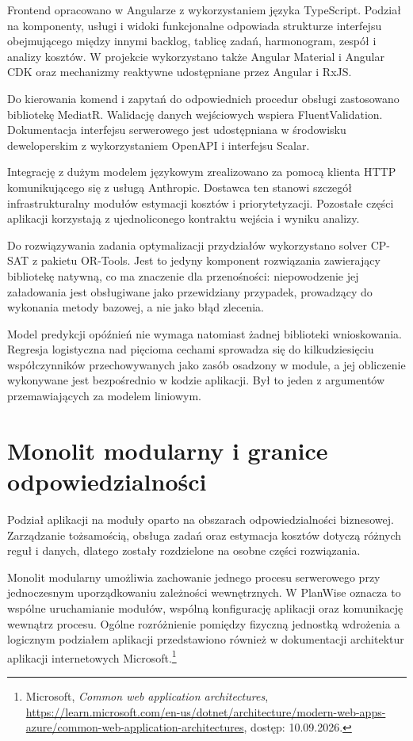 Frontend opracowano w Angularze z wykorzystaniem języka TypeScript. Podział na komponenty, usługi i widoki funkcjonalne odpowiada strukturze interfejsu obejmującego między innymi backlog, tablicę zadań, harmonogram, zespół i analizy kosztów. W projekcie wykorzystano także Angular Material i Angular CDK oraz mechanizmy reaktywne udostępniane przez Angular i RxJS.

Do kierowania komend i zapytań do odpowiednich procedur obsługi zastosowano bibliotekę MediatR. Walidację danych wejściowych wspiera FluentValidation. Dokumentacja interfejsu serwerowego jest udostępniana w środowisku deweloperskim z wykorzystaniem OpenAPI i interfejsu Scalar.

Integrację z dużym modelem językowym zrealizowano za pomocą klienta HTTP komunikującego się z usługą Anthropic. Dostawca ten stanowi szczegół infrastrukturalny modułów estymacji kosztów i priorytetyzacji. Pozostałe części aplikacji korzystają z ujednoliconego kontraktu wejścia i wyniku analizy.

Do rozwiązywania zadania optymalizacji przydziałów wykorzystano solver CP-SAT z pakietu OR-Tools. Jest to jedyny komponent rozwiązania zawierający bibliotekę natywną, co ma znaczenie dla przenośności: niepowodzenie jej załadowania jest obsługiwane jako przewidziany przypadek, prowadzący do wykonania metody bazowej, a nie jako błąd zlecenia.

Model predykcji opóźnień nie wymaga natomiast żadnej biblioteki wnioskowania. Regresja logistyczna nad pięcioma cechami sprowadza się do kilkudziesięciu współczynników przechowywanych jako zasób osadzony w module, a jej obliczenie wykonywane jest bezpośrednio w kodzie aplikacji. Był to jeden z argumentów przemawiających za modelem liniowym.

\section{Monolit modularny i granice odpowiedzialności}

Podział aplikacji na moduły oparto na obszarach odpowiedzialności biznesowej. Zarządzanie tożsamością, obsługa zadań oraz estymacja kosztów dotyczą różnych reguł i danych, dlatego zostały rozdzielone na osobne części rozwiązania.

Monolit modularny umożliwia zachowanie jednego procesu serwerowego przy jednoczesnym uporządkowaniu zależności wewnętrznych. W PlanWise oznacza to wspólne uruchamianie modułów, wspólną konfigurację aplikacji oraz komunikację wewnątrz procesu. Ogólne rozróżnienie pomiędzy fizyczną jednostką wdrożenia a logicznym podziałem aplikacji przedstawiono również w dokumentacji architektur aplikacji internetowych Microsoft.\footnote{Microsoft, \textit{Common web application architectures}, \url{https://learn.microsoft.com/en-us/dotnet/architecture/modern-web-apps-azure/common-web-application-architectures}, dostęp: 10.09.2026.}

